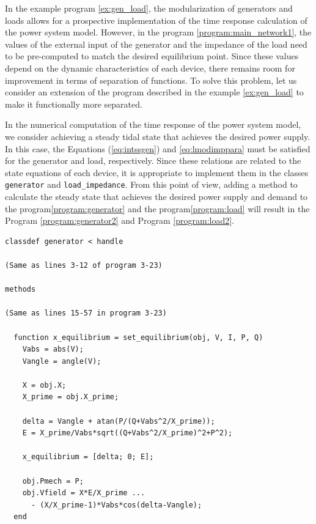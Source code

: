 \documentclass[graybox, envcountchap]{svmult}
\begin{document}
In the example program \ref{ex:gen_load}, the modularization of generators and loads allows for a prospective implementation of the time response calculation of the power system model.
However, in the program \nobreak\ref{program:main_network1}, the values of the external input of the generator and the impedance of the load need to be pre-computed to match the desired equilibrium point.
Since these values depend on the dynamic characteristics of each device, there remains room for improvement in terms of separation of functions.
To solve this problem, let us consider an extension of the program described in the example \ref{ex:gen_load} to make it functionally more separated.


\begin{example}
In the numerical computation of the time response of the power system model, we consider achieving a steady tidal state that achieves the desired power supply.
In this case, the Equations (\ref{eq:intssgen}) and \ref{eq:lmodimppara} must be satisfied for the generator and load, respectively.
Since these relations are related to the state equations of each device, it is appropriate to implement them in the classes \verb|generator| and \verb|load_impedance|.
From this point of view, adding a method to calculate the steady state that achieves the desired power supply and demand to the program\ref{program:generator} and the program\ref{program:load} will result in the Program \nobreak\ref{program:generator2} and Program \ref{program:load2}.

\smallskip
\begin{PROGRAMA}[count,title={generator.m}]\label{program:generator2}
  \begin{verbatim}
classdef generator < handle
  
(Same as lines 3-12 of program 3-23)

methods

(Same as lines 15-57 in program 3-23)

  function x_equilibrium = set_equilibrium(obj, V, I, P, Q)
    Vabs = abs(V);
    Vangle = angle(V);
    
    X = obj.X;
    X_prime = obj.X_prime;
    
    delta = Vangle + atan(P/(Q+Vabs^2/X_prime));
    E = X_prime/Vabs*sqrt((Q+Vabs^2/X_prime)^2+P^2);
    
    x_equilibrium = [delta; 0; E];
    
    obj.Pmech = P;
    obj.Vfield = X*E/X_prime ...
      - (X/X_prime-1)*Vabs*cos(delta-Vangle);
  end


\end{verbatim}
\end{PROGRAMA}
\end{example}
\end{document}
